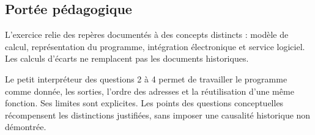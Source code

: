 \subsection*{Portée pédagogique}

L'exercice relie des repères documentés à des concepts distincts : modèle de
calcul, représentation du programme, intégration électronique et service
logiciel. Les calculs d'écarts ne remplacent pas les documents historiques.

Le petit interpréteur des questions 2 à 4 permet de travailler le programme
comme donnée, les sorties, l'ordre des adresses et la réutilisation d'une même
fonction. Ses limites sont explicites. Les points des questions conceptuelles
récompensent les distinctions justifiées, sans imposer une causalité historique
non démontrée.

